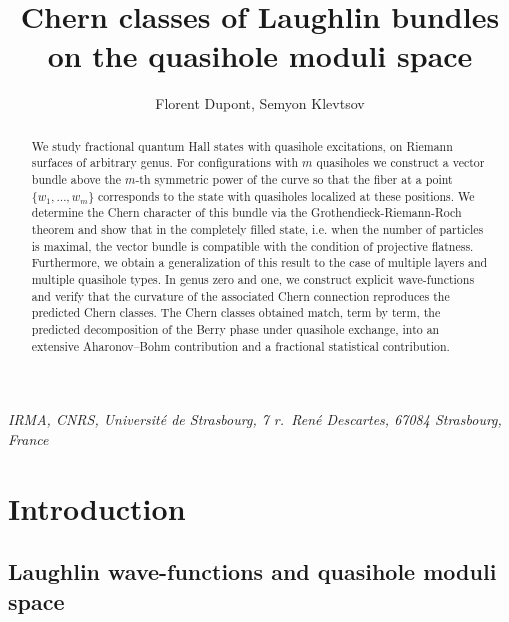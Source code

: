 \documentclass{article}
\theoremstyle{definition}
\begin{document}
\title{Chern classes of Laughlin bundles\\ on the quasihole moduli space}
\author{Florent Dupont, Semyon Klevtsov}
\date{}

\maketitle

\begin{center}
 {\it\small
\noindent
IRMA, CNRS, Université de Strasbourg, 7 r.~René Descartes, 67084 Strasbourg, France}
   
\end{center}



\begin{abstract}

    We study fractional quantum Hall states with quasihole excitations, on Riemann surfaces of arbitrary genus. For configurations with $m$ quasiholes we construct a vector bundle above the $m$-th symmetric power of the curve so that the fiber at a point $\lbrace w_1,\dots,w_m \rbrace$ corresponds to the state with quasiholes localized at these positions. We determine the Chern character of this bundle via the Grothendieck-Riemann-Roch theorem and show that in the completely filled state, i.e. when the number of particles is maximal, the vector bundle is compatible with the condition of projective flatness. Furthermore, we obtain a generalization of this result to the case of multiple layers and multiple quasihole types. In genus zero and one, we construct explicit wave-functions and verify that the curvature of the associated Chern connection reproduces the predicted Chern classes. The Chern classes obtained match, term by term, the predicted decomposition of the Berry phase under quasihole exchange, into an extensive Aharonov–Bohm contribution and a fractional statistical contribution.

\end{abstract}

\tableofcontents

\section{Introduction}

\subsection{Laughlin wave-functions and quasihole moduli space}
\end{document}
